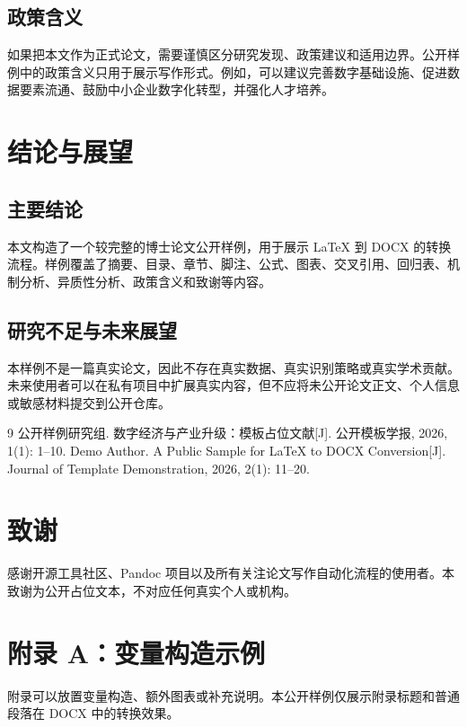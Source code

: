 \documentclass[12pt]{ctexbook}
\begin{document}
\section{政策含义}
如果把本文作为正式论文，需要谨慎区分研究发现、政策建议和适用边界。公开样例中的政策含义只用于展示写作形式。例如，可以建议完善数字基础设施、促进数据要素流通、鼓励中小企业数字化转型，并强化人才培养。

\chapter{结论与展望}
\section{主要结论}
本文构造了一个较完整的博士论文公开样例，用于展示 LaTeX 到 DOCX 的转换流程。样例覆盖了摘要、目录、章节、脚注、公式、图表、交叉引用、回归表、机制分析、异质性分析、政策含义和致谢等内容。

\section{研究不足与未来展望}
本样例不是一篇真实论文，因此不存在真实数据、真实识别策略或真实学术贡献。未来使用者可以在私有项目中扩展真实内容，但不应将未公开论文正文、个人信息或敏感材料提交到公开仓库。

\backmatter
\begin{thebibliography}{9}
 公开样例研究组. 数字经济与产业升级：模板占位文献[J]. 公开模板学报, 2026, 1(1): 1--10.
 Demo Author. A Public Sample for LaTeX to DOCX Conversion[J]. Journal of Template Demonstration, 2026, 2(1): 11--20.
\end{thebibliography}

\chapter*{致谢}
感谢开源工具社区、Pandoc 项目以及所有关注论文写作自动化流程的使用者。本致谢为公开占位文本，不对应任何真实个人或机构。

\chapter*{附录 A：变量构造示例}
附录可以放置变量构造、额外图表或补充说明。本公开样例仅展示附录标题和普通段落在 DOCX 中的转换效果。
\end{document}
